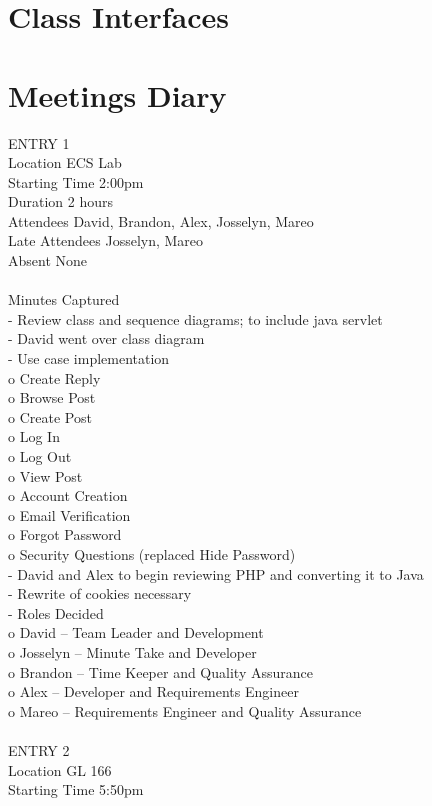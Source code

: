 \documentclass{report}
\begin{document}
\chapter{Class Interfaces}
\chapter{Meetings Diary}
ENTRY 1\\	
Location		ECS Lab\\
Starting Time		2:00pm\\
Duration		2 hours\\
Attendees		David, Brandon, Alex, Josselyn, Mareo\\
Late Attendees	Josselyn, Mareo\\
Absent		None\\
\\
Minutes Captured\\
-	Review class and sequence diagrams; to include java servlet\\
-	David went over class diagram\\
-	Use case implementation\\
o	Create Reply\\
o	Browse Post\\
o	Create Post\\
o	Log In\\
o	Log Out\\
o	View Post\\
o	Account Creation\\
o	Email Verification\\
o	Forgot Password\\
o	Security Questions (replaced Hide Password)\\
-	David and Alex to begin reviewing PHP and converting it to Java\\
-	Rewrite of cookies necessary\\
-	Roles Decided\\
o	David – Team Leader and Development\\
o	Josselyn – Minute Take and Developer\\
o	Brandon – Time Keeper and Quality Assurance\\
o	Alex – Developer and Requirements Engineer\\
o	Mareo – Requirements Engineer and Quality Assurance\\
\\
ENTRY 2\\	
Location		GL 166\\
Starting Time		5:50pm\\
\end{document}
